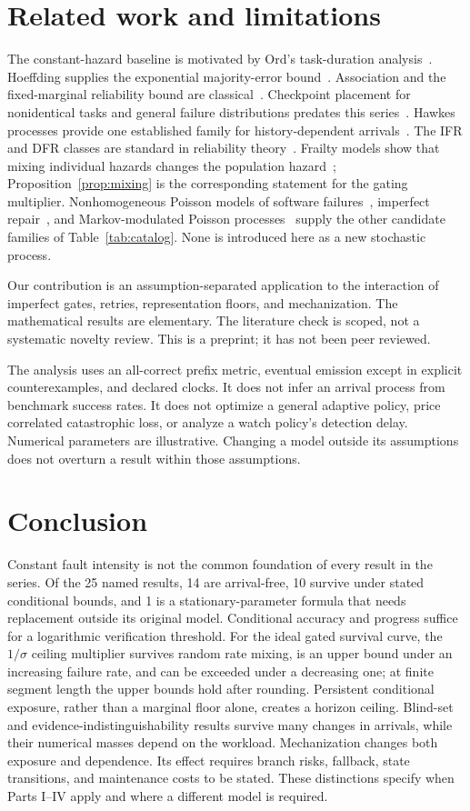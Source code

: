 \documentclass[11pt]{article}
\theoremstyle{definition}
\theoremstyle{remark}
\begin{document}
\section{Related work and limitations}
The constant-hazard baseline is motivated by Ord's task-duration analysis~\cite{ord}.
Hoeffding supplies the exponential majority-error bound~\cite{hoeffding}.
Association and the fixed-marginal reliability bound are classical~\cite{epw}.
Checkpoint placement for nonidentical tasks and general failure distributions predates this
series~\cite{toueg}. Hawkes processes provide one established family for history-dependent
arrivals~\cite{hawkes}. The IFR and DFR classes are standard in reliability theory~\cite{bp}.
Frailty models show that mixing individual hazards changes the population hazard~\cite{vaupel};
Proposition~\ref{prop:mixing} is the corresponding statement for the gating multiplier.
Nonhomogeneous Poisson models of software failures~\cite{goel}, imperfect repair~\cite{brownproschan},
and Markov-modulated Poisson processes~\cite{mmpp} supply the other candidate families of
Table~\ref{tab:catalog}. None is introduced here as a new stochastic process.

Our contribution is an assumption-separated application to the interaction of imperfect gates,
retries, representation floors, and mechanization. The mathematical results are elementary.
The literature check is scoped, not a systematic novelty review. This is a preprint; it has not been
peer reviewed.

The analysis uses an all-correct prefix metric, eventual emission except in explicit
counterexamples, and declared clocks. It does not infer an arrival process from benchmark
success rates. It does not optimize a general adaptive policy, price correlated catastrophic
loss, or analyze a watch policy's detection delay. Numerical parameters are illustrative.
Changing a model outside its assumptions does not overturn a result within those assumptions.

\section{Conclusion}
Constant fault intensity is not the common foundation of every result in the series.
Of the 25 named results, 14 are arrival-free, 10 survive under stated conditional bounds, and 1
is a stationary-parameter formula that needs replacement outside its original model.
Conditional accuracy and progress suffice for a logarithmic verification threshold.
For the ideal gated survival curve, the $1/\sigma$ ceiling multiplier survives random rate
mixing, is an upper bound under an increasing failure rate, and can be exceeded under a decreasing
one; at finite segment length the upper bounds hold after rounding.
Persistent conditional exposure, rather than a marginal floor alone, creates a horizon ceiling.
Blind-set and evidence-indistinguishability results survive many changes in arrivals, while
their numerical masses depend on the workload. Mechanization changes both exposure and
dependence. Its effect requires branch risks, fallback, state transitions, and maintenance
costs to be stated. These distinctions specify when Parts I--IV apply and where a different
model is required.
\end{document}
